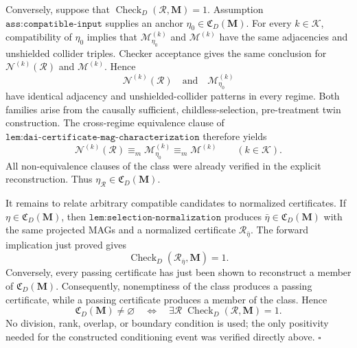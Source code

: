 Conversely, suppose that \(\operatorname{Check}_{D}(\mathcal R,\mathbf M)=1\).  Assumption \(\texttt{ass:compatible-input}\) supplies an anchor \(\eta_0\in\mathfrak C_D(\mathbf M)\).  For every \(k\in\mathcal K\), compatibility of \(\eta_0\) implies that \(\mathcal M_{\eta_0}^{(k)}\) and \(\mathcal M^{(k)}\) have the same adjacencies and unshielded collider triples.  Checker acceptance gives the same conclusion for \(\mathcal N^{(k)}(\mathcal R)\) and \(\mathcal M^{(k)}\).  Hence
\[
\mathcal N^{(k)}(\mathcal R)
\quad\text{and}\quad
\mathcal M_{\eta_0}^{(k)}
\]
have identical adjacency and unshielded-collider patterns in every regime.  Both families arise from the causally sufficient, childless-selection, pre-treatment twin construction.  The cross-regime equivalence clause of \(\texttt{lem:dai-certificate-mag-characterization}\) therefore yields
\[
\mathcal N^{(k)}(\mathcal R)
\equiv_m \mathcal M_{\eta_0}^{(k)}
\equiv_m \mathcal M^{(k)}
\qquad(k\in\mathcal K).
\]
All non-equivalence clauses of the class were already verified in the explicit reconstruction.  Thus \(\eta_{\mathcal R}\in\mathfrak C_D(\mathbf M)\).

It remains to relate arbitrary compatible candidates to normalized certificates.  If \(\eta\in\mathfrak C_D(\mathbf M)\), then \(\texttt{lem:selection-normalization}\) produces \(\bar\eta\in\mathfrak C_D(\mathbf M)\) with the same projected MAGs and a normalized certificate \(\mathcal R_{\bar\eta}\).  The forward implication just proved gives
\[
\operatorname{Check}_{D}(\mathcal R_{\bar\eta},\mathbf M)=1.
\]
Conversely, every passing certificate has just been shown to reconstruct a member of \(\mathfrak C_D(\mathbf M)\).  Consequently, nonemptiness of the class produces a passing certificate, while a passing certificate produces a member of the class.  Hence
\[
\mathfrak C_D(\mathbf M)\ne\varnothing
\quad\Longleftrightarrow\quad
\exists\mathcal R\;\operatorname{Check}_{D}(\mathcal R,\mathbf M)=1.
\]
No division, rank, overlap, or boundary condition is used; the only positivity needed for the constructed conditioning event was verified directly above. \(\square\)